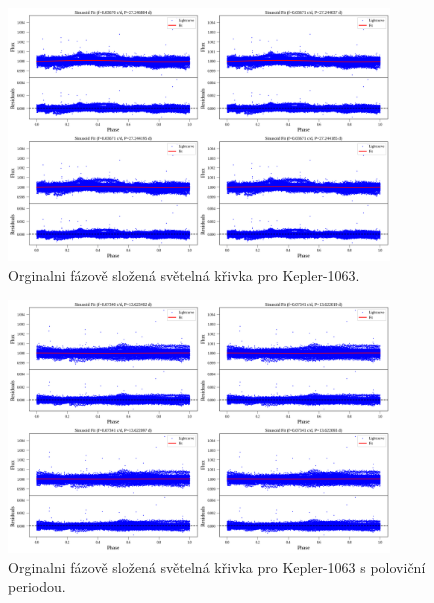 \documentclass[a4paper,11pt,twocolumn]{article}
\begin{document}
    \begin{figure}
        \centering
        \includegraphics[width=0.9\textwidth]{phase/Kepler-1063_phase_folded_orig.png}
        \caption{Orginalni fázově složená světelná křivka pro Kepler-1063.}
        \label{fig:kplr_phase_folded_orig}
    \end{figure}

    \begin{figure}
        \centering
        \includegraphics[width=0.9\textwidth]{phase/Kepler-1063_phase_folded_orig_teor.png}
        \caption{Orginalni fázově složená světelná křivka pro Kepler-1063 s poloviční periodou.}
        \label{fig:Kepler-1063_phase_folded_orig_teor}
    \end{figure}
\end{document}
